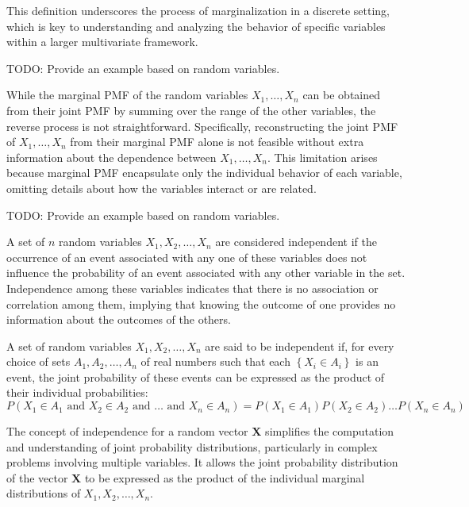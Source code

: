 This definition underscores the process of marginalization in a discrete setting, which is key to understanding and analyzing the behavior of specific variables within a larger multivariate framework.

\begin{example}
{\color{red} TODO: Provide an example based on random variables.}
\end{example}

While the marginal PMF of the random variables $X_1, \ldots, X_n$ can be obtained from their joint PMF by summing over the range of the other variables, the reverse process is not straightforward. Specifically, reconstructing the joint PMF of $X_1, \ldots, X_n$ from their marginal PMF alone is not feasible without extra information about the dependence between $X_1, \ldots, X_n$. This limitation arises because marginal PMF encapsulate only the individual behavior of each variable, omitting details about how the variables interact or are related.

\begin{example}
{\color{red} TODO: Provide an example based on random variables.}
\end{example}

A set of $n$ random variables $X_1, X_2, \ldots, X_n$ are considered independent if the occurrence of an event associated with any one of these variables does not influence the probability of an event associated with any other variable in the set. Independence among these variables indicates that there is no association or correlation among them, implying that knowing the outcome of one provides no information about the outcomes of the others.

\begin{definition}
A set of random variables $X_1, X_2, \ldots, X_n$ are said to be independent if, for every choice of sets $A_1, A_2, \ldots, A_n$ of real numbers such that each $\left\{ X_i \in A_i \right\}$ is an event, the joint probability of these events can be expressed as the product of their individual probabilities:
\[
P\left(X_1 \in A_1 \text{ and } X_2 \in A_2 \text{ and } \ldots \text{ and } X_n \in A_n\right) = P\left(X_1 \in A_1\right)P\left(X_2 \in A_2\right)\ldots P\left(X_n \in A_n\right)
\]
\end{definition}

The concept of independence for a random vector $\mathbf{X}$ simplifies the computation and understanding of joint probability distributions, particularly in complex problems involving multiple variables. It allows the joint probability distribution of the vector $\mathbf{X}$ to be expressed as the product of the individual marginal distributions of $X_1, X_2, \ldots, X_n$. 

